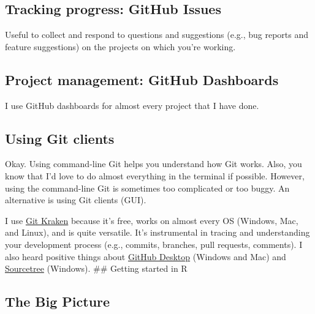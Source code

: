 \documentclass[
  letterpaper,
  DIV=11,
  numbers=noendperiod]{scrreprt}
\begin{document}
\hypertarget{tracking-progress-github-issues}{%
\subsection*{Tracking progress: GitHub
Issues}\label{tracking-progress-github-issues}}

Useful to collect and respond to questions and suggestions (e.g., bug
reports and feature suggestions) on the projects on which you're
working.

\hypertarget{project-management-github-dashboards}{%
\subsection*{Project management: GitHub
Dashboards}\label{project-management-github-dashboards}}

I use GitHub dashboards for almost every project that I have done.

\hypertarget{using-git-clients}{%
\subsection*{Using Git clients}\label{using-git-clients}}

Okay. Using command-line Git helps you understand how Git works. Also,
you know that I'd love to do almost everything in the terminal if
possible. However, using the command-line Git is sometimes too
complicated or too buggy. An alternative is using Git clients (GUI).

I use \href{https://www.gitkraken.com/}{Git Kraken} because it's free,
works on almost every OS (Windows, Mac, and Linux), and is quite
versatile. It's instrumental in tracing and understanding your
development process (e.g., commits, branches, pull requests, comments).
I also heard positive things about
\href{https://desktop.github.com/}{GitHub Desktop} (Windows and Mac) and
\href{https://www.sourcetreeapp.com/}{Sourcetree} (Windows). \#\#
Getting started in R

\hypertarget{the-big-picture-2}{%
\subsection*{The Big Picture}\label{the-big-picture-2}}
\end{document}
